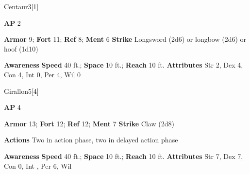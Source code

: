 \begin{monsection}{Centaur}{3}[1]
\vspace{-1em}\vspace{-1em}
\begin{spellcontent}
\begin{spelltargetinginfo}
{\textbf{AP} 2}

\pari \textbf{Armor} 9;
\textbf{Fort} 11;
\textbf{Ref} 8;
\textbf{Ment} 6
\pari \textbf{Strike} Longsword  (2d6) or longbow  (2d6) or hoof  (1d10)



\end{spelltargetinginfo}


\end{spellcontent}

\begin{monsterfooter}
\pari \textbf{Awareness} 
\pari \textbf{Speed} 40 ft.;
\textbf{Space} 10 ft.;
\textbf{Reach} 10 ft.
\pari \textbf{Attributes}
Str 2,
Dex 4,
Con 4,
Int 0,
Per 4,
Wil 0
\end{monsterfooter}
\end{monsection}



\begin{monsection}{Girallon}{5}[4]
\vspace{-1em}\vspace{-1em}
\begin{spellcontent}
\begin{spelltargetinginfo}
{\textbf{AP} 4}

\pari \textbf{Armor} 13;
\textbf{Fort} 12;
\textbf{Ref} 12;
\textbf{Ment} 7
\pari \textbf{Strike} Claw  (2d8)


\pari \textbf{Actions} Two in action phase, two in delayed action phase
\end{spelltargetinginfo}


\end{spellcontent}

\begin{monsterfooter}
\pari \textbf{Awareness} 
\pari \textbf{Speed} 40 ft.;
\textbf{Space} 10 ft.;
\textbf{Reach} 10 ft.
\pari \textbf{Attributes}
Str 7,
Dex 7,
Con 0,
Int ,
Per 6,
Wil 
\end{monsterfooter}
\end{monsection}



